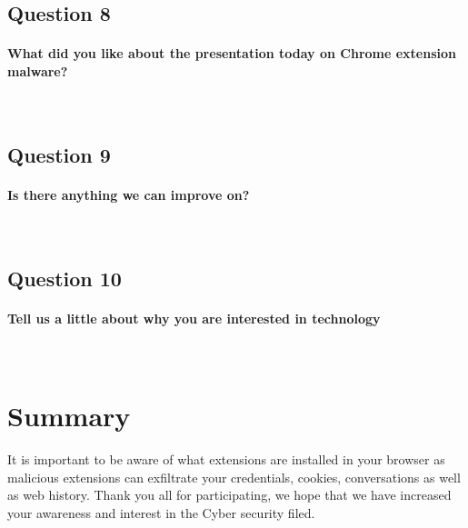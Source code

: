 \documentclass{article}
\newcommand\tab[1][0.5cm]{\hspace*{#1}}
\begin{document}
\subsection{Question 8}
\paragraph{What did you like about the presentation today on Chrome extension malware?}\mbox{}\\
\newline
\framebox[\textwidth]{\rule{0pt}{80pt}}

\subsection{Question 9}
\paragraph{Is there anything we can improve on?}\mbox{}\\
\newline
\framebox[\textwidth]{\rule{0pt}{80pt}}

\pagebreak

\subsection{Question 10}
\paragraph{Tell us a little about why you are interested in technology}\mbox{}\\
\newline
\framebox[\textwidth]{\rule{0pt}{80pt}}

\pagebreak

\section{Summary}
\tab It is important to be aware of what extensions are installed in your browser as malicious extensions can exfiltrate your credentials, cookies, conversations as well as web history. Thank you all for participating, we hope that we have increased your awareness and interest in the Cyber security filed.
\end{document}
